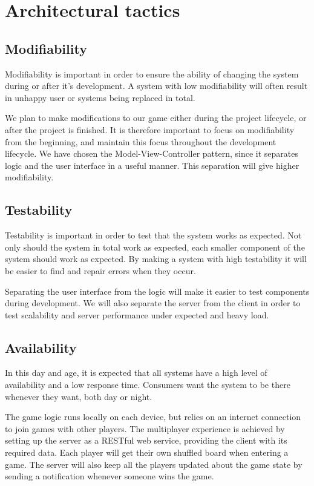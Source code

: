 \section{Architectural tactics}
\label{sec:architecturaltactics}

\subsection{Modifiability} 
Modifiability is important in order to ensure the ability of changing the system during or after it's development. A system with low modifiability will often result in unhappy user or systems being replaced in total. 

We plan to make modifications to our game either during the project lifecycle, or after the project is finished. It is therefore important to focus on modifiability from the beginning, and maintain this focus throughout the development lifecycle. We have chosen the Model-View-Controller pattern, since it separates logic and the user interface in a useful manner. This separation
will give higher modifiability.

\subsection{Testability}
Testability is important in order to test that the system works as expected. Not only should the system in total work as expected, each smaller component of the system should work as expected. By making a system with high testability it will be easier to find and repair errors when they occur.

Separating the user interface from the logic will make it easier to test components during development. We will also separate the server from the client in order to test scalability and server performance under expected and heavy load.

\subsection{Availability} 
In this day and age, it is expected that all systems have a high level of availability and a low response time. Consumers want the system to be there whenever they want, both day or night. 

The game logic runs locally on each device, but relies on an internet connection to join games with other players. The multiplayer experience is achieved by setting up the server as a RESTful web service, providing the client with its required data. Each player will get their own shuffled board when entering a game. The server will also keep all the players updated about the game state by sending a notification whenever someone wins the game.

